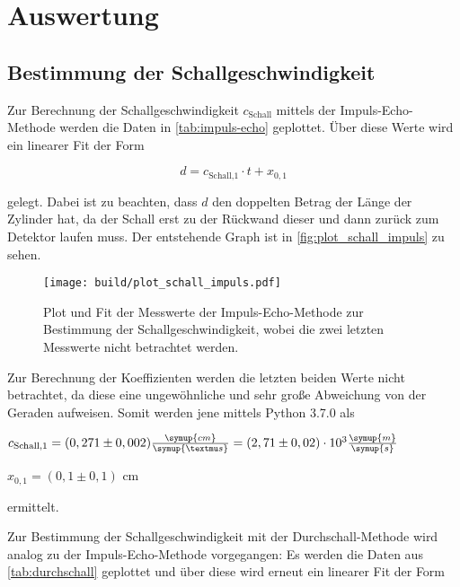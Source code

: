 \section{Auswertung}
\label{sec:Auswertung}
\subsection{Bestimmung der Schallgeschwindigkeit}

Zur Berechnung der Schallgeschwindigkeit $c_\text{Schall}$ mittels der Impuls-Echo-Methode werden die Daten in \autoref{tab:impuls-echo} geplottet.
Über diese Werte wird ein linearer Fit der Form

\begin{equation}
    d = c_\text{Schall,1} \cdot t + x_{0,1}
\end{equation}

gelegt. Dabei ist zu beachten, dass $d$ den doppelten Betrag der Länge der Zylinder hat, da der Schall erst zu der Rückwand dieser und dann zurück zum Detektor laufen muss.
Der entstehende Graph ist in \autoref{fig:plot_schall_impuls} zu sehen.



\begin{figure}
    \centering
    \texttt{[image: build/plot\_schall\_impuls.pdf]}
    \caption{Plot und Fit der Messwerte der Impuls-Echo-Methode zur Bestimmung der Schallgeschwindigkeit, wobei die zwei letzten Messwerte nicht betrachtet werden.}
    \label{fig:plot_schall_impuls}
\end{figure}

Zur Berechnung der Koeffizienten werden die letzten beiden Werte nicht betrachtet, da diese eine ungewöhnliche und sehr große Abweichung von der Geraden aufweisen.
Somit werden jene mittels Python 3.7.0 als

\begin{center}
    $c_\text{Schall,1} = (0,271 \pm 0,002) \frac{\symup{cm}}{\symup{µs}} = (2,71 \pm 0,02) \cdot 10^{3} \frac{\symup{m}}{\symup{s}}$
    
    $x_{0,1} = (0,1 \pm 0,1)$ cm
\end{center}

ermittelt.




Zur Bestimmung der Schallgeschwindigkeit mit der Durchschall-Methode wird analog zu der Impuls-Echo-Methode vorgegangen:
Es werden die Daten aus \autoref{tab:durchschall} geplottet und über diese wird erneut ein linearer Fit der Form

